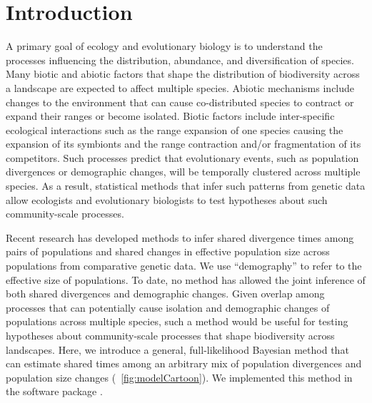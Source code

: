 \section{Introduction}

A primary goal of ecology and evolutionary biology is to understand the
processes influencing the distribution, abundance, and diversification of
species.
Many biotic and abiotic factors that shape the distribution of biodiversity
across a landscape are expected to affect multiple species.
Abiotic mechanisms include changes to the environment that can cause
co-distributed species to contract or expand their ranges or become isolated.
Biotic factors include inter-specific ecological interactions such as the range
expansion of one species causing the expansion of its symbionts and the range
contraction and/or fragmentation of its competitors.
Such processes predict that evolutionary events, such as population divergences
or demographic changes,
will be temporally clustered across multiple species.
As a result, statistical methods that infer such patterns from genetic data
allow ecologists and evolutionary biologists to test hypotheses about such
community-scale processes.

Recent research has developed methods to infer shared divergence times
among pairs of populations
\citep{Hickerson2006,Hickerson2007,Huang2011,Oaks2014dpp,Oaks2018ecoevolity}
and shared changes in effective population size across populations
\citep{Chan2014,Xue2015,Burbrink2016,Xue2017,Gehara2017}
from comparative genetic data.
We use ``demography'' to refer to the effective size of populations.
To date, no method has allowed the joint inference of both shared divergences
and demographic changes.
Given overlap among processes that can potentially cause isolation and
demographic changes of populations across multiple species, such a method would
be useful for testing hypotheses about community-scale processes that shape
biodiversity across landscapes.
Here, we introduce a general, full-likelihood Bayesian method that can estimate
shared times among an arbitrary mix of population divergences and population
size changes (\fig{}~\ref{fig:modelCartoon}).
We implemented this method in the software package \ecoevolity.

